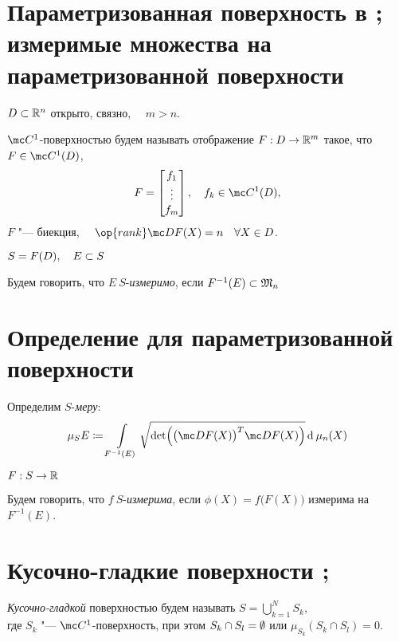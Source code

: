 \section{Параметризованная поверхность в ; измеримые множества на параметризованной поверхности}

\begin{definition}
	$ D \subset \mathbb{R}^n $ открыто, связно, $ \quad m > n $.

	$ \mc C^1 $-поверхностью будем называть отображение $ F : D \to \mathbb{R}^m $ такое, что $ F \in \mc C^1(D) $, \ie
	$$ F = \column{f_1}{f_m}, \quad f_k \in \mc C^1(D), $$
	$ F $ "--- биекция, $ \quad \op{rank} \mc DF(X) = n \quad \forall X \in D $.
\end{definition}

\begin{definition}
	$ S = F(D), \quad E \subset S $

	Будем говорить, что $ E ~ S $-\emph{измеримо}, если $ F^{-1}(E) \subset \mathfrak M_n $
\end{definition}

\section{Определение  для параметризованной поверхности }

\begin{definition}
	Определим $ S $-\emph{меру}:
	$$ \mu_S E \coloneq \int\limits_{F^{-1}(E)} \sqrt{\det \Bigl( \bigl( \mc DF(X) \bigr)^T \mc DF(X) \Bigr)} \di \mu_n(X) $$
\end{definition}

\begin{definition}
	$ F : S \to \mathbb{R} $

	Будем говорить, что $ f ~ S $-\emph{измерима}, если $ \phi(X) = f \bigl( F(X) \bigr) $ измерима на $ F^{-1}(E) $.
\end{definition}

\section{Кусочно-гладкие поверхности ; }

\begin{definition}
	\emph{Кусочно-гладкой} поверхностью будем называть $ S = \bigcup_{k = 1}^N S_k $, \\
	где $ S_k $ "--- $ \mc C^1 $-поверхность, при этом $ S_k \cap S_l = \emptyset $ или $ \mu_{S_k}(S_k \cap S_l) = 0 $.
\end{definition}

